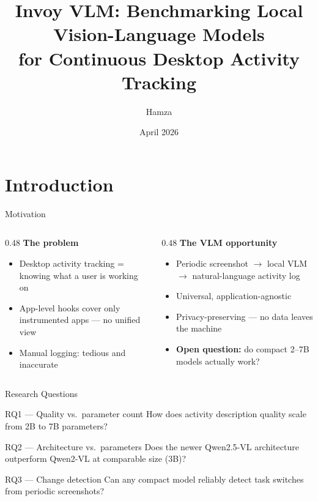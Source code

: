 \documentclass[10pt, aspectratio=169]{beamer}
\title[Invoy VLM]{Invoy VLM: Benchmarking Local Vision-Language Models\\
       for Continuous Desktop Activity Tracking}
\author{Hamza}
\date{April 2026}
\institute{\texttt{invoy\_sdk} Research Project}
\begin{document}
\begin{frame}
  \titlepage
\end{frame}

\section{Introduction}

\begin{frame}{Motivation}
  \begin{columns}[T]
    \begin{column}{0.48\textwidth}
      \textbf{The problem}
      \begin{itemize}
        \item Desktop activity tracking = knowing what a user is working on
        \item App-level hooks cover only instrumented apps — no unified view
        \item Manual logging: tedious and inaccurate
      \end{itemize}
    \end{column}
    \begin{column}{0.48\textwidth}
      \textbf{The VLM opportunity}
      \begin{itemize}
        \item Periodic screenshot $\to$ local VLM $\to$ natural-language activity log
        \item Universal, application-agnostic
        \item Privacy-preserving — no data leaves the machine
        \item \textbf{Open question:} do compact 2–7B models actually work?
      \end{itemize}
    \end{column}
  \end{columns}
\end{frame}

\begin{frame}{Research Questions}
  \begin{block}{RQ1 — Quality vs.\ parameter count}
    How does activity description quality scale from 2B to 7B parameters?
  \end{block}
  \vspace{0.4em}
  \begin{block}{RQ2 — Architecture vs.\ parameters}
    Does the newer Qwen2.5-VL architecture outperform Qwen2-VL at comparable size (3B)?
  \end{block}
  \vspace{0.4em}
  \begin{block}{RQ3 — Change detection}
    Can any compact model reliably detect task switches from periodic screenshots?
  \end{block}
\end{frame}
\end{document}
